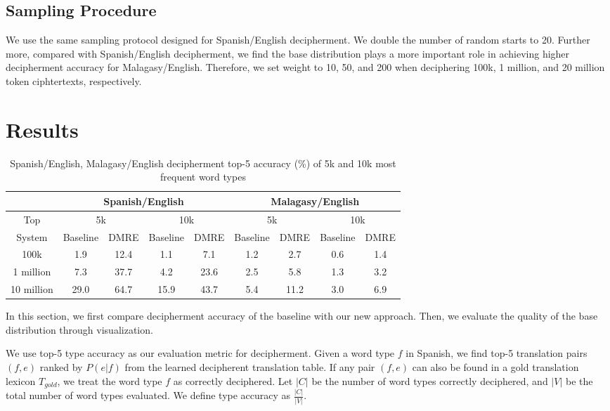 \subsection{Sampling Procedure}

We use the same sampling protocol designed for Spanish/English decipherment. We double the number of random starts to 20. Further more, compared with Spanish/English decipherment, we find the base distribution plays a more important role in achieving higher decipherment accuracy for Malagasy/English. Therefore, we set weight to 10, 50, and 200 when deciphering 100k, 1 million, and 20 million token ciphtertexts, respectively.


\section{Results}

%
 \begin{table}[!ht]
 \begin{center}
 \begin{tabular}{ |c|c|c|c|c|c|c|c|c| } \hline
         & \multicolumn{4}{|c|}{Spanish/English} & \multicolumn{4}{|c|}{Malagasy/English} \\ \hline
 Top &  \multicolumn{2}{|c|}{5k} & \multicolumn{2}{|c|}{10k} & \multicolumn{2}{|c|}{5k} & \multicolumn{2}{|c|}{10k} \\ \hline
 System &  Baseline & DMRE & Baseline & DMRE &  Baseline & DMRE & Baseline & DMRE \\ \hline
 100k &  1.9 & 12.4 & 1.1 & 7.1 &  1.2 & 2.7 & 0.6 & 1.4 \\ \hline
 1 million &  7.3 & 37.7& 4.2 & 23.6 &  2.5 & 5.8 & 1.3 & 3.2 \\ \hline
 10 million &  29.0 & 64.7 & 15.9 & 43.7 &  5.4 & 11.2 & 3.0 & 6.9 \\ \hline
 \end{tabular}
 \caption{Spanish/English, Malagasy/English decipherment top-5 accuracy (\%) of 5k and 10k most frequent word types}
 \label{decipher-acc-result}
 \end{center}
 \end{table}
%

In this section, we first compare decipherment accuracy of the baseline with our new approach. Then, we evaluate the quality of the base distribution through visualization.

We use top-5 type accuracy as our evaluation metric for decipherment. Given a word type $f$ in Spanish, we find top-5 translation pairs $(f,e)$ ranked by $P(e|f)$ from the learned decipherent translation table. If any pair $(f,e)$ can also be found in a gold translation lexicon $T_{gold}$, we treat the word type $f$ as correctly deciphered. Let $|C|$ be the number of word types correctly deciphered, and $|V|$ be the total number of word types evaluated. We define type accuracy as $\frac{|C|}{|V|}$.

